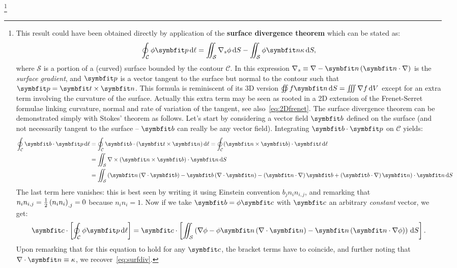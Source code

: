 \footnote{This result could have been obtained directly by application of the \textbf{surface divergence theorem} which can be stated as:
\begin{equation}
\oint_{\mathcal C} \phi \bp \,\mathrm d\ell = \iint_{\mathcal S} \nabla_s \phi \,\mathrm dS - \iint_{\mathcal S} \phi \bn \kappa\,\mathrm dS,
\label{eq:surfdiv}
\end{equation}
where $\mathcal S$ is a portion of a (curved) surface bounded by the contour $\mathcal C$. In this expression $\nabla_s\equiv\nabla-\bn\lp\bn\cdot\nabla\rp$ is the \textit{surface gradient}, and $\bp$ is a vector tangent to the surface but normal to the contour such that $\bp = \bt \times \bn$. This formula is reminiscent of its 3D version $\oiint f \bn \, \mathrm dS = \iiint \nabla f \, \mathrm dV$ except for an extra term involving the curvature of the surface. Actually this extra term may be seen as rooted in a 2D extension of the Frenet-Serret formulae linking curvature, normal and rate of variation of the tangent, see also~\eqref{eq:2Dfrenet}.
\noindent The surface divergence theorem can be demonstrated simply with Stokes' theorem as follows. Let's start by considering a vector field $\bb$ defined on the surface (and not necessarily tangent to the surface -- $\bb$ can really be any vector field). Integrating $\bb\cdot\bp$ on $\mathcal C$ yields:
\begin{alignat*}{1}
\oint_{\mathcal C} \bb\cdot\bp\,\mathrm d\ell &= \oint_{\mathcal C} \bb\cdot(\bt\times\bn)\,\mathrm d\ell = \oint_{\mathcal C} (\bn\times\bb)\cdot\bt\,\mathrm d\ell\\
&= \iint_{\mathcal S} \nabla\times\lp\bn\times\bb\rp\cdot\bn\,\mathrm dS\\
&=\iint_{\mathcal S}\lp\bn\lp\nabla\cdot\bb\rp - \bb\lp\nabla\cdot\bn\rp-\lp\bn\cdot\nabla\rp\bb+\lp\bb\cdot\nabla\rp\bn\rp\cdot\bn\,\mathrm dS
\end{alignat*}
The last term here vanishes: this is best seen by writing it using Einstein convention $b_j n_i n_{i,j}$, and remarking that $n_i n_{i,j} = \tfrac{1}{2} \left( n_i n_i \right)_{,j} = 0$ because $n_i n_i = 1$. Now if we take $\bb = \phi \bc$ with $\bc$ an arbitrary \textit{constant} vector, we get:
\begin{equation}
\bc\cdot\left[\oint_{\mathcal C} \phi \bp\,\mathrm d\ell\right] = \bc\cdot\left[\iint_{\mathcal S} \lp\nabla \phi -\phi\bn\lp\nabla\cdot\bn\rp-\bn\lp\bn\cdot\nabla\phi\rp\rp\,\mathrm dS \right].
\end{equation}
Upon remarking that for this equation to hold for any $\bc$, the bracket terms have to coincide, and further noting that $\nabla\cdot\bn\equiv\kappa$, we recover~\eqref{eq:surfdiv}.

}
